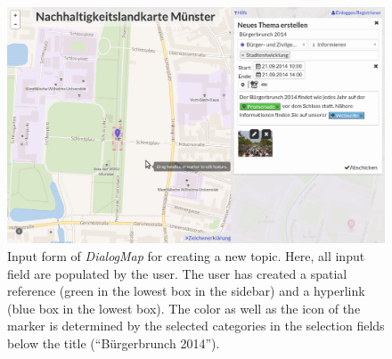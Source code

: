 \begin{figure}[!h]
    \centering
    \includegraphics[width=1\columnwidth]{images/screenshot_create}
    \caption{Input form of \textit{DialogMap} for creating a new topic. Here, all input field are populated by the user. The user has created a spatial reference (green in the lowest box in the sidebar) and a hyperlink (blue box in the lowest box). The color as well as the icon of the marker is determined by the selected categories in the selection fields below the title (``Bürgerbrunch 2014'').}
    \label{fig:screenshot_create}
\end{figure}

